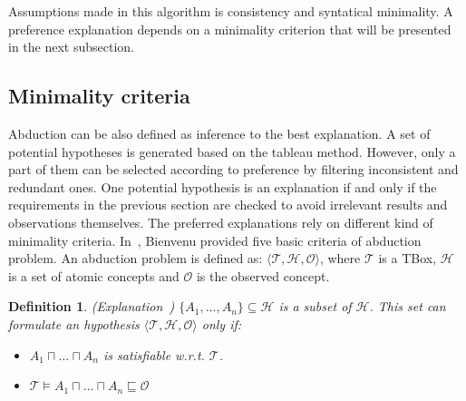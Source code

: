 \documentclass{article}
\newtheorem{mydef}{Definition}
\begin{document}
Assumptions made in this algorithm is consistency and syntatical minimality. 
A preference explanation depends on a minimality criterion that will be presented in the next subsection.


\subsection{Minimality criteria}
Abduction can be also defined as inference to the best explanation.
A set of potential hypotheses is generated based on the tableau method. However, only a part of them can be selected according to preference by filtering inconsistent and redundant ones. 
One potential hypothesis is an explanation if and only if the requirements in the previous section are checked to avoid irrelevant results and observations themselves.
The preferred explanations  rely on different kind of minimality criteria. 
In~\cite{bienvenu08complexity}, Bienvenu provided five basic criteria of abduction problem.
An abduction problem is defined as: $ \langle \mathcal{T}, \mathcal{H}, \mathcal{O}\rangle$, where $\mathcal{T}$ is a TBox, $\mathcal{H}$ is a set of atomic concepts and $\mathcal{O}$ is the observed concept.

\begin{mydef}{(Explanation~\cite{bienvenu-kr08})}
$\{ A_1,\dots,A_n \} \subseteq \mathcal{H}$ is a subset of $\mathcal{H}$. This set can formulate an hypothesis $ \langle \mathcal{T}, \mathcal{H}, \mathcal{O}\rangle$ only if:
\begin{itemize}
\item  $A_1 \sqcap \dots \sqcap A_n$ is satisfiable w.r.t. $\mathcal{T}$.
\item $\mathcal{T}  \vDash  A_1 \sqcap \dots \sqcap A_n \sqsubseteq \mathcal{O}$
\end{itemize}

\end{mydef}
\end{document}
